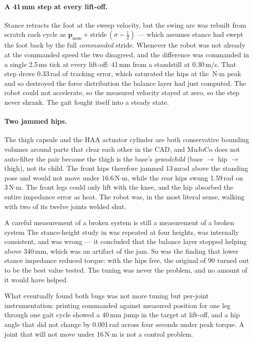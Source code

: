 \documentclass[11pt,a4paper]{article}
\begin{document}
\paragraph{A 41\,mm step at every lift-off.} Stance retracts the foot at the
sweep velocity, but the swing arc was rebuilt from scratch each cycle as
$\mathbf{p}_{\text{nom}} + \text{stride}\,(\sigma - \tfrac12)$ --- which
assumes stance had swept the foot back by the full \emph{commanded} stride.
Whenever the robot was not already at the commanded speed the two disagreed,
and the difference was commanded in a single 2.5\,ms tick at every lift-off:
41\,mm from a standstill at 0.30\,m/s. That step drove 0.33\,rad of tracking
error, which saturated the hips at the \RdTorquePeak\,N$\cdot$m peak and so
destroyed the force distribution the balance layer had just computed. The robot
could not accelerate, so the measured velocity stayed at zero, so the step
never shrank. The gait fought itself into a steady state.

\paragraph{Two jammed hips.} The thigh capsule and the HAA actuator cylinder
are both conservative bounding volumes around parts that clear each other in
the CAD, and MuJoCo does not auto-filter the pair because the thigh is the
base's \emph{grandchild} (base $\to$ hip $\to$ thigh), not its child. The
front hips therefore jammed 13\,mrad above the standing pose and would not
move under 16.6\,N$\cdot$m, while the rear hips swung 1.59\,rad on 3\,N$\cdot$m.
The front legs could only lift with the knee, and the hip absorbed the entire
impedance error as heat. The robot was, in the most literal sense, walking with
two of its twelve joints welded shut.

\begin{caveat}{A careful measurement of a broken system is still a measurement of a broken system}
The stance-height study in  was repeated at four heights, was
internally consistent, and was wrong --- it concluded that the balance layer
stopped helping above 340\,mm, which was an artifact of the jam. So was the
finding that lower stance impedance reduced torque: with the hips free, the
original  of 90 turned out to be the best value tested. The
tuning was never the problem, and no amount of it would have helped.

What eventually found both bugs was not more tuning but per-joint
instrumentation: printing commanded against measured position for one leg
through one gait cycle showed a 40\,mm jump in the target at lift-off, and a
hip angle that did not change by 0.001\,rad across four seconds under peak
torque. A joint that will not move under 16\,N$\cdot$m is not a control
problem.
\end{caveat}
\end{document}
